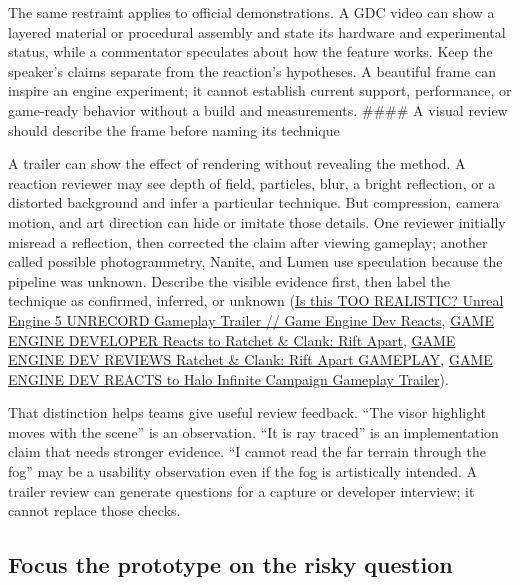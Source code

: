 The same restraint applies to official demonstrations. A GDC video can show a layered material or procedural assembly and state its hardware and experimental status, while a commentator speculates about how the feature works. Keep the speaker's claims separate from the reaction's hypotheses. A beautiful frame can inspire an engine experiment; it cannot establish current support, performance, or game-ready behavior without a build and measurements. \#\#\#\# A visual review should describe the frame before naming its technique

A trailer can show the effect of rendering without revealing the method. A reaction reviewer may see depth of field, particles, blur, a bright reflection, or a distorted background and infer a particular technique. But compression, camera motion, and art direction can hide or imitate those details. One reviewer initially misread a reflection, then corrected the claim after viewing gameplay; another called possible photogrammetry, Nanite, and Lumen use speculation because the pipeline was unknown. Describe the visible evidence first, then label the technique as confirmed, inferred, or unknown (\href{https://www.youtube.com/watch?v=p4aAMPtNIsQ&t=0m0s}{Is this TOO REALISTIC? Unreal Engine 5 UNRECORD Gameplay Trailer // Game Engine Dev Reacts}, \href{https://www.youtube.com/watch?v=qCSyy5BTDuc&t=0m0s}{GAME ENGINE DEVELOPER Reacts to Ratchet \& Clank: Rift Apart}, \href{https://www.youtube.com/watch?v=d5_9EEfN-Mw&t=0m0s}{GAME ENGINE DEV REVIEWS Ratchet \& Clank: Rift Apart GAMEPLAY}, \href{https://www.youtube.com/watch?v=HWtEcbiuLBQ&t=0m0s}{GAME ENGINE DEV REACTS to Halo Infinite \textbar{} Campaign Gameplay Trailer}).

That distinction helps teams give useful review feedback. ``The visor highlight moves with the scene'' is an observation. ``It is ray traced'' is an implementation claim that needs stronger evidence. ``I cannot read the far terrain through the fog'' may be a usability observation even if the fog is artistically intended. A trailer review can generate questions for a capture or developer interview; it cannot replace those checks.

\subsection{Focus the prototype on the risky question}\label{05-engine-i-ch009-focus-the-prototype-on-the-risky-question}

\hypertarget{05-engine-i-ch009-focus-the-prototype-on-the-risky-question}{}

